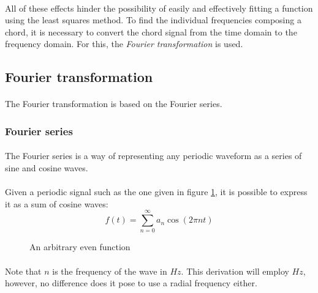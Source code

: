 \documentclass{article}
\begin{document}
\paragraph*{}
All of these effects hinder the possibility of easily and effectively fitting 
a function using the least squares method. To find the individual frequencies 
composing a chord, it is necessary to convert the chord signal from the time 
domain to the frequency domain. For this, the \textit{Fourier transformation} 
is used.

\subsection{Fourier transformation}

\paragraph*{}
The Fourier transformation is based on the Fourier series.

\subsubsection{Fourier series}

\paragraph*{}
The Fourier series is a way of representing any periodic waveform as a series 
of sine and cosine waves.

\paragraph*{}
Given a periodic signal such as the one given in figure \ref{fig:odd-arb-func},
it is possible to express it as a sum of cosine waves:
$$f(t) = \sum^{\infty}_{n=0}a_n \cos(2 \pi n t)$$
\begin{figure}[ht]
	\centering
	\caption{An arbitrary even function}
	\label{fig:odd-arb-func}
\end{figure}

\paragraph*{}
Note that $n$ is the frequency of the wave in $\si{Hz}$. This derivation will 
employ $\si{Hz}$, however, no difference does it pose to use a radial frequency
either.
\end{document}
